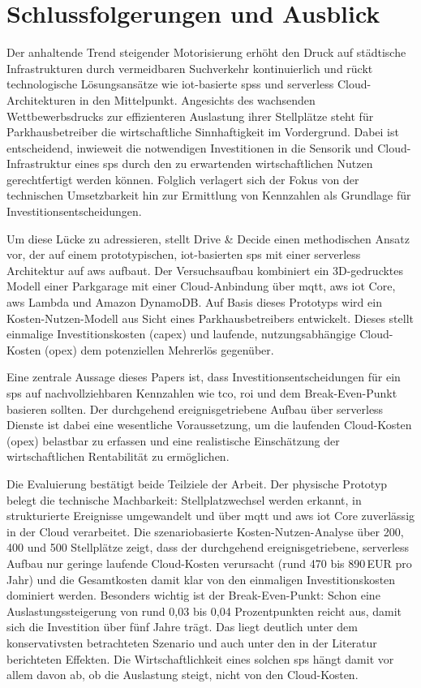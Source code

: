 \section{Schlussfolgerungen und Ausblick}\label{sec:conclusion}

Der anhaltende Trend steigender Motorisierung erhöht den Druck auf städtische Infrastrukturen durch vermeidbaren Suchverkehr kontinuierlich und rückt technologische Lösungsansätze wie \ac{iot}-basierte \acp{sps} und serverless Cloud-Architekturen in den Mittelpunkt. Angesichts des wachsenden Wettbewerbsdrucks zur effizienteren Auslastung ihrer Stellplätze steht für Parkhausbetreiber die wirtschaftliche Sinnhaftigkeit im Vordergrund. Dabei ist entscheidend, inwieweit die notwendigen Investitionen in die Sensorik und Cloud-Infrastruktur eines \ac{sps} durch den zu erwartenden wirtschaftlichen Nutzen gerechtfertigt werden können. Folglich verlagert sich der Fokus von der technischen Umsetzbarkeit hin zur Ermittlung von Kennzahlen als Grundlage für Investitionsentscheidungen.

Um diese Lücke zu adressieren, stellt Drive \& Decide einen methodischen Ansatz vor, der auf einem prototypischen, \ac{iot}-basierten \ac{sps} mit einer serverless Architektur auf \ac{aws} aufbaut. Der Versuchsaufbau kombiniert ein 3D-gedrucktes Modell einer Parkgarage mit einer Cloud-Anbindung über \ac{mqtt}, \ac{aws} \ac{iot} Core, \ac{aws} Lambda und Amazon DynamoDB. Auf Basis dieses Prototyps wird ein Kosten-Nutzen-Modell aus Sicht eines Parkhausbetreibers entwickelt. Dieses stellt einmalige Investitionskosten (\ac{capex}) und laufende, nutzungsabhängige Cloud-Kosten (\ac{opex}) dem potenziellen Mehrerlös gegenüber.

Eine zentrale Aussage dieses Papers ist, dass Investitionsentscheidungen für ein \ac{sps} auf nachvollziehbaren Kennzahlen wie \ac{tco}, \ac{roi} und dem Break-Even-Punkt basieren sollten. Der durchgehend ereignisgetriebene Aufbau über serverless Dienste ist dabei eine wesentliche Voraussetzung, um die laufenden Cloud-Kosten (\ac{opex}) belastbar zu erfassen und eine realistische Einschätzung der wirtschaftlichen Rentabilität zu ermöglichen.

Die Evaluierung bestätigt beide Teilziele der Arbeit. Der physische Prototyp belegt die technische Machbarkeit: Stellplatzwechsel werden erkannt, in strukturierte Ereignisse umgewandelt und über \ac{mqtt} und \ac{aws} \ac{iot} Core zuverlässig in der Cloud verarbeitet. Die szenariobasierte Kosten-Nutzen-Analyse über 200, 400 und 500 Stellplätze zeigt, dass der durchgehend ereignisgetriebene, serverless Aufbau nur geringe laufende Cloud-Kosten verursacht (rund 470 bis 890\,EUR pro Jahr) und die Gesamtkosten damit klar von den einmaligen Investitionskosten dominiert werden. Besonders wichtig ist der Break-Even-Punkt: Schon eine Auslastungssteigerung von rund 0{,}03 bis 0{,}04 Prozentpunkten reicht aus, damit sich die Investition über fünf Jahre trägt. Das liegt deutlich unter dem konservativsten betrachteten Szenario und auch unter den in der Literatur berichteten Effekten. Die Wirtschaftlichkeit eines solchen \ac{sps} hängt damit vor allem davon ab, ob die Auslastung steigt, nicht von den Cloud-Kosten.

